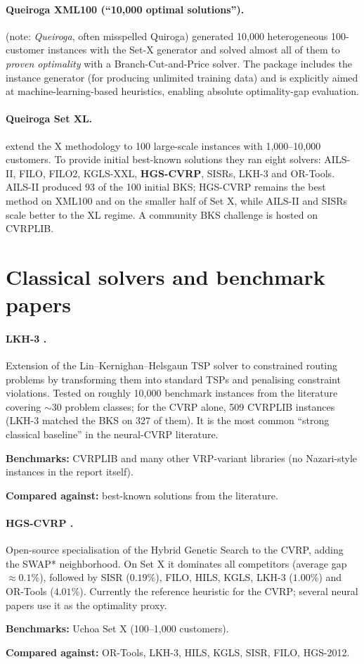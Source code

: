 \documentclass[11pt]{article}
\newcommand{\benchline}[1]{\par\smallskip\noindent\textbf{Benchmarks:} #1}
\newcommand{\baseline}[1]{\par\noindent\textbf{Compared against:} #1}
\begin{document}
\paragraph{Queiroga XML100 (``10{,}000 optimal solutions'').}
\citet{queiroga_10000_nodate} (note: \emph{Queiroga}, often misspelled Quiroga) generated
10{,}000 heterogeneous 100-customer instances with the Set-X generator and solved almost
all of them to \emph{proven optimality} with a Branch-Cut-and-Price solver. The package
includes the instance generator (for producing unlimited training data) and is explicitly
aimed at machine-learning-based heuristics, enabling absolute optimality-gap evaluation.

\paragraph{Queiroga Set XL.}
\citet{queiroga_xl_2026} extend the X methodology to 100 large-scale instances with
1{,}000--10{,}000 customers. To provide initial best-known solutions they ran eight
solvers: AILS-II, FILO, FILO2, KGLS-XXL, \textbf{HGS-CVRP}, SISRs, LKH-3 and OR-Tools.
AILS-II produced 93 of the 100 initial BKS; HGS-CVRP remains the best method on XML100 and
on the smaller half of Set X, while AILS-II and SISRs scale better to the XL regime. A
community BKS challenge is hosted on CVRPLIB.

\section{Classical solvers and benchmark papers}

\paragraph{LKH-3 \citep{helsgaun_extension_2017}.}
Extension of the Lin--Kernighan--Helsgaun TSP solver to constrained routing problems by
transforming them into standard TSPs and penalising constraint violations. Tested on
roughly 10{,}000 benchmark instances from the literature covering $\sim$30 problem
classes; for the CVRP alone, 509 CVRPLIB instances (LKH-3 matched the BKS on 327 of them).
It is the most common ``strong classical baseline'' in the neural-CVRP literature.
\benchline{CVRPLIB and many other VRP-variant libraries (no Nazari-style instances in the
report itself).}
\baseline{best-known solutions from the literature.}

\paragraph{HGS-CVRP \citep{vidal_hybrid_2022}.}
Open-source specialisation of the Hybrid Genetic Search to the CVRP, adding the SWAP*
neighborhood. On Set X it dominates all competitors (average gap $\approx 0.1\%$),
followed by SISR ($0.19\%$), FILO, HILS, KGLS, LKH-3 ($1.00\%$) and OR-Tools ($4.01\%$).
Currently the reference heuristic for the CVRP; several neural papers use it as the
optimality proxy.
\benchline{Uchoa Set X (100--1{,}000 customers).}
\baseline{OR-Tools, LKH-3, HILS, KGLS, SISR, FILO, HGS-2012.}
\end{document}
